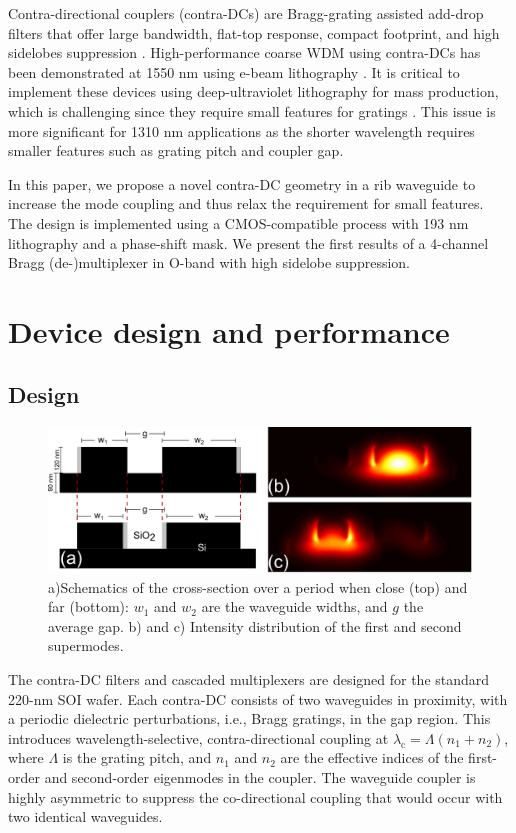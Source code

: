 \documentclass[letterpaper,10pt]{article}
\begin{document}
Contra-directional couplers (contra-DCs) are Bragg-grating assisted add-drop filters that offer large bandwidth, flat-top response, compact footprint, and high sidelobes suppression \cite{shi2013siliconContraDC}. High-performance coarse WDM using contra-DCs has been demonstrated at 1550 nm using e-beam lithography \cite{shi2013siliconCWDM}. It is critical to implement these devices using deep-ultraviolet lithography for mass production, which is challenging since they 
require small features for gratings \cite{shi2013coupler}. This issue is more significant for 1310 nm applications as the shorter wavelength requires smaller features such as grating pitch and coupler gap.

In this paper, we propose a novel contra-DC geometry in a rib waveguide to increase the mode coupling and thus relax the requirement for small features. The design is implemented using a CMOS-compatible process with 193 nm lithography and a phase-shift mask.  We present the first results of a 4-channel Bragg (de-)multiplexer in O-band with high sidelobe suppression.

\section{Device design and performance}
\subsection{Design} 
\begin{figure}[htbp]
	\centering
	\includegraphics[width=.65\columnwidth]{CrossSection3}
	\caption{ a)Schematics of the cross-section over a period when close (top) and far (bottom): $w_1$ and $w_2$ are the waveguide widths, and $g$ the average gap. b) and c) Intensity distribution of the first and second supermodes. }
    \vspace{-20pt}
	\label{fig:Device}
\end{figure}

The contra-DC filters and cascaded multiplexers are designed for the standard 220-nm SOI wafer. Each contra-DC consists of two waveguides in proximity, with a periodic dielectric perturbations, i.e., Bragg gratings, in the gap region. This introduces wavelength-selective, contra-directional coupling at  $\lambda_\text{c} = \Lambda (n_\text{1}+n_\text{2})$, where $\Lambda$ is the grating pitch, and $n_\text{1}$ and $n_\text{2}$ are the effective indices of the first-order and second-order eigenmodes in the coupler. 
The waveguide coupler is highly asymmetric to suppress the co-directional coupling that would occur with two identical waveguides.
\end{document}
